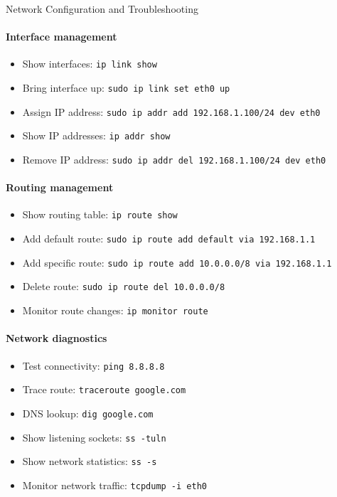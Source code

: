\begin{KR}{Network Configuration and Troubleshooting}
    \paragraph{Interface management}
    \begin{itemize}
        \item Show interfaces: \texttt{ip link show}
        \item Bring interface up: \texttt{sudo ip link set eth0 up}
        \item Assign IP address: \texttt{sudo ip addr add 192.168.1.100/24 dev eth0}
        \item Show IP addresses: \texttt{ip addr show}
        \item Remove IP address: \texttt{sudo ip addr del 192.168.1.100/24 dev eth0}
    \end{itemize}
    
    \paragraph{Routing management}
    \begin{itemize}
        \item Show routing table: \texttt{ip route show}
        \item Add default route: \texttt{sudo ip route add default via 192.168.1.1}
        \item Add specific route: \texttt{sudo ip route add 10.0.0.0/8 via 192.168.1.1}
        \item Delete route: \texttt{sudo ip route del 10.0.0.0/8}
        \item Monitor route changes: \texttt{ip monitor route}
    \end{itemize}
    
    \paragraph{Network diagnostics}
    \begin{itemize}
        \item Test connectivity: \texttt{ping 8.8.8.8}
        \item Trace route: \texttt{traceroute google.com}
        \item DNS lookup: \texttt{dig google.com}
        \item Show listening sockets: \texttt{ss -tuln}
        \item Show network statistics: \texttt{ss -s}
        \item Monitor network traffic: \texttt{tcpdump -i eth0}
    \end{itemize}
    

\end{KR}
